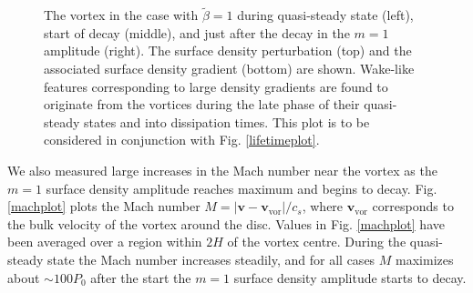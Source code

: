 \begin{figure}
{  }
  \hfill
  \hfill
  \caption{The vortex in the case with $\tilde{\beta}=1$
    during quasi-steady state (left), start of decay 
    (middle), and just after the decay in the $m=1$ amplitude
    (right). The surface density perturbation
    (top) and the associated surface density gradient (bottom) are
    shown. Wake-like features corresponding to large density gradients
    are found to originate from the vortices during the late phase of 
    their quasi-steady states and into dissipation times.
    This plot is to be considered in conjunction with
    Fig. \ref{lifetimeplot}. 
    \label{shockplot}}
\end{figure}

We also measured large increases in the Mach number near
the vortex as the $m=1$ surface density amplitude reaches maximum and begins to decay. 
Fig. \ref{machplot} plots the Mach number $M=|\bm{v} -
\bm{v}_\mathrm{vor}|/c_s$, where 
$\bm{v}_\mathrm{vor}$ corresponds to the bulk velocity of the vortex
around the disc. Values in Fig. \ref{machplot} have been averaged over
a region within $2H$ of the vortex centre. 
During the quasi-steady state the Mach number increases 
steadily, and for all cases $M$ maximizes about
$\sim 100P_0$ after the start the $m=1$ surface density
amplitude starts to decay. 

